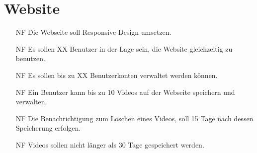 \section{Website}
\begin{itemize}
\item[NF] Die Webseite soll Responsive-Design umsetzen.

\item[NF] Es sollen XX Benutzer in der Lage sein, die Website gleichzeitig zu benutzen.

\item[NF] Es sollen bis zu XX Benutzerkonten verwaltet werden können.

\item[NF] Ein Benutzer kann bis zu 10 Videos auf der Webseite speichern und verwalten.

\item[NF] Die Benachrichtigung zum Löschen eines Videos, soll 15 Tage nach dessen Speicherung erfolgen.

\item[NF] Videos sollen nicht länger als 30 Tage gespeichert werden.

\end{itemize}





